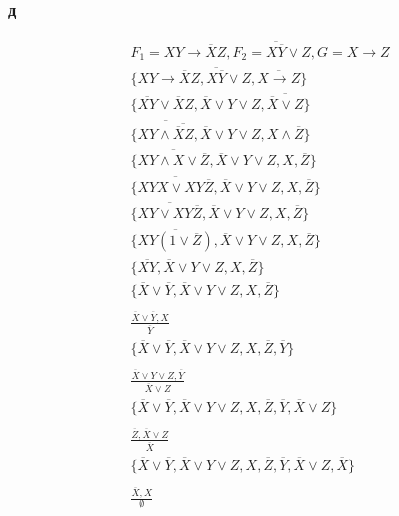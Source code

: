 \documentclass[12pt]{article}
\begin{document}
\subsubsection{д}
\begin{gather*}
  F_1 = X Y \rightarrow \overline{X}Z, F_2 = \overline{X \overline{Y}} \vee Z, G = X \rightarrow Z \\
  \{XY \rightarrow \overline{X}Z, \overline{X \overline{Y}} \vee Z, \overline{X \rightarrow Z}\} \\
  \{\overline{XY} \vee \overline{X}Z, \overline{X} \vee Y \vee Z, \overline{\overline{X} \vee Z}\} \\
  \{\overline{XY \wedge \overline{\overline{X}Z}}, \overline{X} \vee Y \vee Z, X \wedge \overline{Z}\} \\
  \{\overline{XY \wedge X \vee \overline{Z}}, \overline{X} \vee Y \vee Z, X, \overline{Z}\} \\
  \{\overline{XYX \vee XY\overline{Z}}, \overline{X} \vee Y \vee Z, X, \overline{Z}\} \\
  \{\overline{XY \vee XY\overline{Z}}, \overline{X} \vee Y \vee Z, X, \overline{Z}\} \\
  \{\overline{XY \left(1\vee \overline{Z}\right)}, \overline{X} \vee Y \vee Z, X, \overline{Z}\} \\
  \{\overline{XY}, \overline{X} \vee Y \vee Z, X, \overline{Z}\} \\
  \{\overline{X} \vee \overline{Y}, \overline{X} \vee Y \vee Z, X, \overline{Z}\} \\
  \\
  \frac{\overline{X} \vee \overline{Y}, X}{\overline{Y}} \\
  \{\overline{X} \vee \overline{Y}, \overline{X} \vee Y \vee Z, X, \overline{Z}, \overline{Y}\} \\
  \\
  \frac{\overline{X} \vee Y \vee Z, \overline{Y}}{\overline{X} \vee Z} \\
  \{\overline{X} \vee \overline{Y}, \overline{X} \vee Y \vee Z, X, \overline{Z}, \overline{Y}, \overline{X} \vee Z\} \\
  \\
  \frac{\overline{Z}, \overline{X} \vee Z}{\overline{X}} \\
  \{\overline{X} \vee \overline{Y}, \overline{X} \vee Y \vee Z, X, \overline{Z}, \overline{Y}, \overline{X} \vee Z, \overline{X}\} \\
  \\
  \frac{\overline{X}, X}{\emptyset} \\
\end{gather*}
\end{document}
